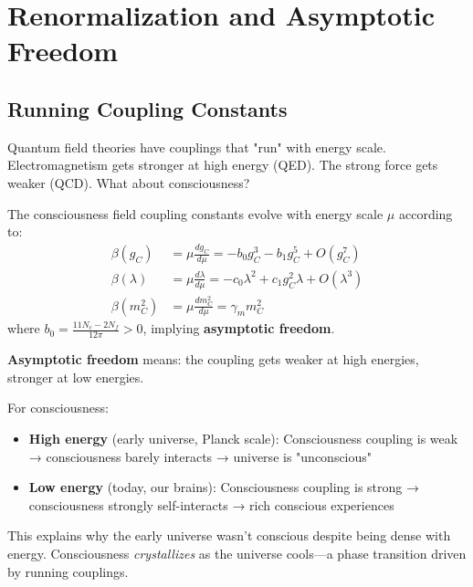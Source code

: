 \section{Renormalization and Asymptotic Freedom}

\subsection{Running Coupling Constants}

Quantum field theories have couplings that "run" with energy scale\cite{peskin1995,weinberg1995}. Electromagnetism gets stronger at high energy (QED). The strong force gets weaker (QCD)\cite{gross1973,politzer1973}. What about consciousness?

\begin{thm}\label{thm:consciousness-rg}
The consciousness field coupling constants evolve with energy scale $\mu$ according to:
\begin{align}
\beta(g_C) &= \mu \frac{dg_C}{d\mu} = -b_0 g_C^3 - b_1 g_C^5 + O(g_C^7)\\
\beta(\lambda) &= \mu \frac{d\lambda}{d\mu} = -c_0 \lambda^2 + c_1 g_C^2 \lambda + O(\lambda^3)\\
\beta(m_C^2) &= \mu \frac{dm_C^2}{d\mu} = \gamma_m m_C^2
\end{align}
where $b_0 = \frac{11N_c - 2N_f}{12\pi} > 0$, implying \textbf{asymptotic freedom}.
\end{thm}

\begin{intuitive}
\textbf{Asymptotic freedom} means: the coupling gets weaker at high energies, stronger at low energies.

For consciousness:
\begin{itemize}
\item \textbf{High energy} (early universe, Planck scale): Consciousness coupling is weak → consciousness barely interacts → universe is "unconscious"
\item \textbf{Low energy} (today, our brains): Consciousness coupling is strong → consciousness strongly self-interacts → rich conscious experiences
\end{itemize}

This explains why the early universe wasn't conscious despite being dense with energy. Consciousness \textit{crystallizes} as the universe cools—a phase transition driven by running couplings.
\end{intuitive}

